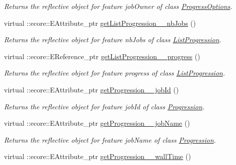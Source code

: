 \begin{DoxyCompactItemize}
\begin{DoxyCompactList}\small\item\em Returns the reflective object for feature jobOwner of class \hyperlink{classTMS__Data_1_1ProgressOptions}{ProgressOptions}. \item\end{DoxyCompactList}\item 
virtual ::ecore::EAttribute\_\-ptr \hyperlink{classTMS__Data_1_1TMS__DataPackage_ab64f7ce84fc658d0a159d30d91eafdb8}{getListProgression\_\-\_\-nbJobs} ()
\begin{DoxyCompactList}\small\item\em Returns the reflective object for feature nbJobs of class \hyperlink{classTMS__Data_1_1ListProgression}{ListProgression}. \item\end{DoxyCompactList}\item 
virtual ::ecore::EReference\_\-ptr \hyperlink{classTMS__Data_1_1TMS__DataPackage_a94fe667f3cbfa6ccbdc8c0a4e1ec7108}{getListProgression\_\-\_\-progress} ()
\begin{DoxyCompactList}\small\item\em Returns the reflective object for feature progress of class \hyperlink{classTMS__Data_1_1ListProgression}{ListProgression}. \item\end{DoxyCompactList}\item 
virtual ::ecore::EAttribute\_\-ptr \hyperlink{classTMS__Data_1_1TMS__DataPackage_ae7b2d4e42fd40a55b413f4a6b1240d4d}{getProgression\_\-\_\-jobId} ()
\begin{DoxyCompactList}\small\item\em Returns the reflective object for feature jobId of class \hyperlink{classTMS__Data_1_1Progression}{Progression}. \item\end{DoxyCompactList}\item 
virtual ::ecore::EAttribute\_\-ptr \hyperlink{classTMS__Data_1_1TMS__DataPackage_a5c6eb0a397301280648769dc4ea3b2c2}{getProgression\_\-\_\-jobName} ()
\begin{DoxyCompactList}\small\item\em Returns the reflective object for feature jobName of class \hyperlink{classTMS__Data_1_1Progression}{Progression}. \item\end{DoxyCompactList}\item 
virtual ::ecore::EAttribute\_\-ptr \hyperlink{classTMS__Data_1_1TMS__DataPackage_a7ca6c1b4a99840f16292c50f573815e9}{getProgression\_\-\_\-wallTime} ()

\end{DoxyCompactItemize}

